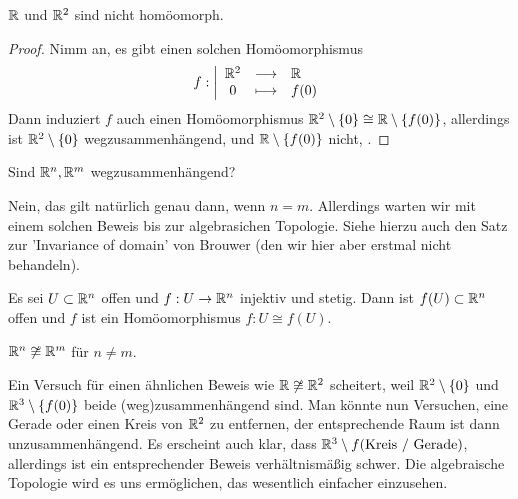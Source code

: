 \begin{corollary}\label{cor:R-und-R2-sind-nicht-homöomorph}
    $\mathbb{R}$ und $\mathbb{R}^2$ sind nicht homöomorph.
\end{corollary}
\begin{proof}
    Nimm an, es gibt einen solchen Homöomorphismus
        \begin{equation*}
        f: \left| \begin{array}{c c l} 
        \mathbb{R}^2 & \longrightarrow & \mathbb{R} \\
        0 & \longmapsto &  f(0)
        \end{array} \right.
    \end{equation*}
    Dann induziert $f$ auch einen Homöomorphismus $\mathbb{R}^2 \setminus \left \{0\right\} \cong \mathbb{R} \setminus \left \{f(0)\right\} $, allerdings ist $\mathbb{R}^2 \setminus \left \{0\right\} $ wegzusammenhängend, und $\mathbb{R} \setminus \left \{f(0)\right\} $ nicht, \contra.
\end{proof}

\begin{question}
    Sind $\mathbb{R}^n, \mathbb{R}^m$ wegzusammenhängend?
\end{question}

\begin{answer}
    Nein, das gilt natürlich genau dann, wenn $n = m$. Allerdings warten wir mit einem solchen Beweis bis zur algebrasichen Topologie. Siehe hierzu auch den Satz zur 'Invariance of domain' von Brouwer (den wir hier aber erstmal nicht behandeln).
    \begin{theorem**}
        Es sei $U\subset \mathbb{R}^n$ offen und $f: U \to  \mathbb{R}^n$ injektiv und stetig. Dann ist $f(U)\subset \mathbb{R}^n$ offen und $f$ ist ein Homöomorphismus  $f: U \cong f(U)$.
    \end{theorem**}
    \begin{corollary**}
        $\mathbb{R}^n \not \cong \mathbb{R}^m$ für $n\neq m$.
    \end{corollary**}
\end{answer}

Ein Versuch für einen ähnlichen Beweis wie $\mathbb{R} \not \cong \mathbb{R}^2$ scheitert, weil $\mathbb{R}^2 \setminus \left \{0\right\}$ und $\mathbb{R}^3 \setminus \left \{f(0)\right\} $ beide (weg)zusammenhängend sind. Man könnte nun Versuchen, eine Gerade oder einen Kreis von $\mathbb{R}^2$ zu entfernen, der entsprechende Raum ist dann unzusammenhängend. Es erscheint auch klar, dass $\mathbb{R}^3 \setminus f(\text{Kreis / Gerade})$, allerdings ist ein entsprechender Beweis verhältnismäßig schwer. Die algebraische Topologie wird es uns ermöglichen, das wesentlich einfacher einzusehen.

